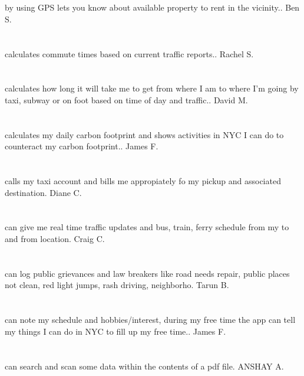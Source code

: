 \section{}by using GPS lets you know about available property to rent in the vicinity.. Ben S.
\section{}calculates commute times based on current traffic reports.. Rachel S.
\section{}calculates how long it will take me to get from where I am to where I'm going by taxi,  subway or on foot based on time of day and traffic.. David M.
\section{}calculates my daily carbon footprint and shows activities in NYC I can do to counteract my carbon footprint.. James F.
\section{}calls my taxi account and bills me appropiately fo my pickup and associated destination.  Diane C.
\section{} can give me real time traffic updates and bus, train, ferry schedule from my to and from location. Craig C.
\section{}can log public grievances and  law breakers like road needs repair,  public places not clean,  red light jumps,  rash driving,  neighborho. Tarun B.
\section{}can note my schedule and hobbies/interest,  during my free time the app can tell my things I can do in NYC to fill up my free time.. James F.
\section{}can search and scan some data within the contents of a pdf file. ANSHAY A.

